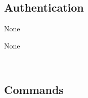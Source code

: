   \subsection{Authentication}\label{int:OnlineServiceOnlineServiceRegisteredUserFacadeAuthentication}
    \begin{description}
      \item[Provided by:] None
      \item[Required by:] None
      \item[Operations:] ~
    \end{description}

  \subsection{Commands}\label{int:OnlineServiceOnlineServiceApplicationManagerDeviceCommandConstructorCommands}
